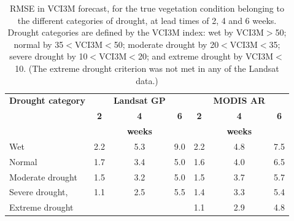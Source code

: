 \documentclass[review]{elsarticle}
\begin{document}
\begin{table}
	\small
	\caption{RMSE in VCI3M forecast, for the true vegetation condition belonging to the different categories of drought, at lead times of 2, 4 and 6 weeks. Drought categories are defined by the VCI3M index: wet by VCI3M$>$50;  normal by 35$<$VCI3M$<$50; moderate drought by 20$<$VCI3M$<$35; severe drought by 10$<$VCI3M$<$20; and extreme drought by VCI3M$<$10.
	(The extreme drought criterion was not met in any of the Landsat data.) } \label{tab:RMScategories}
	\centering
	\begin{tabular}{l|ccc|ccc} 
		\toprule
		\textbf{Drought category} & & \textbf{Landsat GP} & & &\textbf{MODIS AR} \\
		& \textbf{2 } & \textbf{4 } & \textbf{6 } & \textbf{2 } & \textbf{4 } & \textbf{6}\\
		& \multicolumn{3}{c|}{\textbf{weeks}} &  \multicolumn{3}{c}{\textbf{weeks}}\\
		\midrule
		Wet  & 2.2 & 5.3 & 9.0 &2.2& 4.8& 7.5\\
		Normal & 1.7 & 3.4 & 5.0 &1.6& 4.0& 6.5 \\
		Moderate drought & 1.5 &3.2 & 5.0&1.5&3.7& 5.7\\
		Severe drought, & 1.1 &2.5 &5.5&1.4& 3.3& 5.4\\
		Extreme drought & &&& 1.1 & 2.9   & 4.8         \\
		\bottomrule
	\end{tabular}
\end{table}

\end{document}
